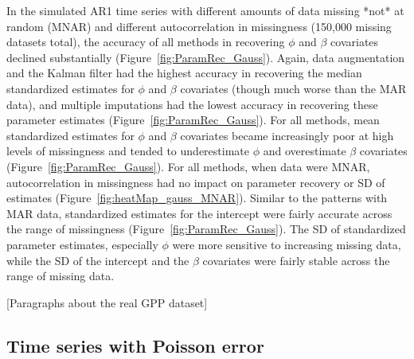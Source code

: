 \documentclass{article}
\begin{document}
In the simulated AR1 time series with different amounts of data missing *not* at random (MNAR) and different autocorrelation in missingness (150,000 missing datasets total), the accuracy of all methods in recovering $\phi$ and $\beta$ covariates declined substantially (Figure~\ref{fig:ParamRec_Gauss}). Again, data augmentation and the Kalman filter had the highest accuracy in recovering the median standardized estimates for $\phi$ and $\beta$ covariates (though much worse than the MAR data), and multiple imputations had the lowest accuracy in recovering these parameter estimates (Figure~\ref{fig:ParamRec_Gauss}). For all methods, mean standardized estimates for $\phi$ and $\beta$ covariates became increasingly poor at high levels of missingness and tended to underestimate $\phi$ and overestimate $\beta$ covariates (Figure~\ref{fig:ParamRec_Gauss}). For all methods, when data were MNAR, autocorrelation in missingness had no impact on parameter recovery or SD of estimates (Figure~\ref{fig:heatMap_gauss_MNAR}). Similar to the patterns with MAR data, standardized estimates for the intercept were fairly accurate across the range of missingness 
(Figure~\ref{fig:ParamRec_Gauss}). The SD of standardized parameter estimates, especially  $\phi$ were more sensitive to increasing missing data, while the SD of the intercept and the $\beta$ covariates were fairly stable across the range of missing data. 

[Paragraphs about the real GPP dataset]

\subsection*{Time series with Poisson error}
\end{document}
